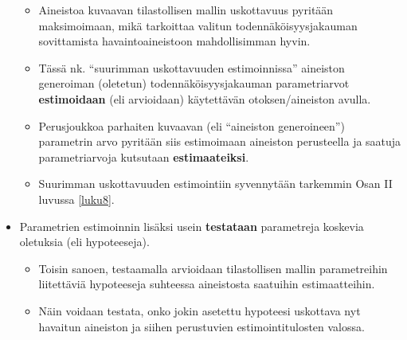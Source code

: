 \documentclass[
]{book}
\providecommand{\tightlist}{%
  \setlength{\itemsep}{0pt}\setlength{\parskip}{0pt}}
\begin{document}
\begin{itemize}
  \begin{itemize}
  \tightlist
  \item
    Aineistoa kuvaavan tilastollisen mallin uskottavuus pyritään maksimoimaan, mikä tarkoittaa valitun todennäköisyysjakauman sovittamista havaintoaineistoon mahdollisimman hyvin.
  \item
    Tässä nk. ``suurimman uskottavuuden estimoinnissa'' aineiston generoiman (oletetun) todennäköisyysjakauman parametriarvot \textbf{estimoidaan} (eli arvioidaan) käytettävän otoksen/aineiston avulla.
  \item
    Perusjoukkoa parhaiten kuvaavan (eli ``aineiston generoineen'') parametrin arvo pyritään siis estimoimaan aineiston perusteella ja saatuja parametriarvoja kutsutaan \textbf{estimaateiksi}.
  \item
    Suurimman uskottavuuden estimointiin syvennytään tarkemmin Osan II luvussa \ref{luku8}.
  \end{itemize}
\item
  Parametrien estimoinnin lisäksi usein \textbf{testataan} parametreja koskevia oletuksia (eli hypoteeseja).

  \begin{itemize}
  \tightlist
  \item
    Toisin sanoen, testaamalla arvioidaan tilastollisen mallin parametreihin liitettäviä hypoteeseja suhteessa aineistosta saatuihin estimaatteihin.
  \item
    Näin voidaan testata, onko jokin asetettu hypoteesi uskottava nyt havaitun aineiston ja siihen perustuvien estimointitulosten valossa.
  \end{itemize}
\end{itemize}
\end{document}
